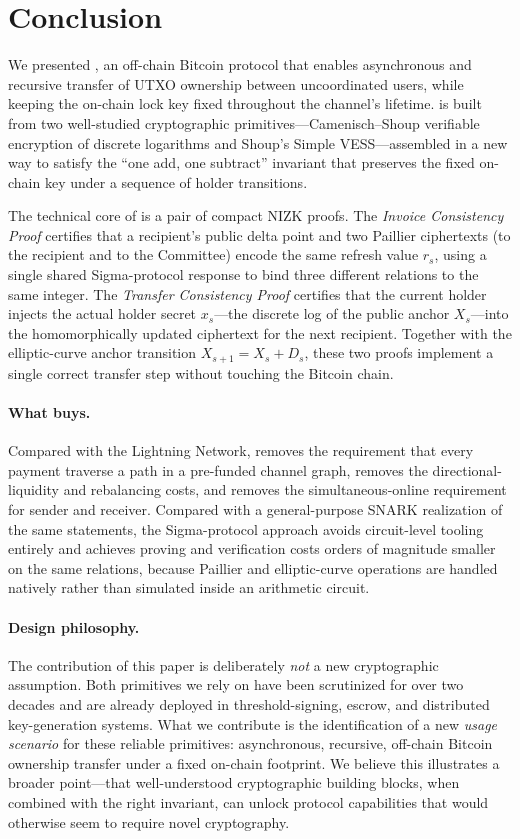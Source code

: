 \section{Conclusion}\label{sec:conclusion}

We presented \thunderbolt, an off-chain Bitcoin protocol that enables asynchronous and recursive transfer of UTXO ownership between uncoordinated users, while keeping the on-chain lock key fixed throughout the channel's lifetime. \thunderbolt is built from two well-studied cryptographic primitives---Camenisch--Shoup verifiable encryption of discrete logarithms and Shoup's Simple VESS---assembled in a new way to satisfy the ``one add, one subtract'' invariant that preserves the fixed on-chain key under a sequence of holder transitions.

The technical core of \thunderbolt is a pair of compact NIZK proofs. The \emph{Invoice Consistency Proof} certifies that a recipient's public delta point and two Paillier ciphertexts (to the recipient and to the Committee) encode the same refresh value $r_s$, using a single shared Sigma-protocol response to bind three different relations to the same integer. The \emph{Transfer Consistency Proof} certifies that the current holder injects the actual holder secret $x_s$---the discrete log of the public anchor $X_s$---into the homomorphically updated ciphertext for the next recipient. Together with the elliptic-curve anchor transition $X_{s+1} = X_s + D_s$, these two proofs implement a single correct transfer step without touching the Bitcoin chain.

\paragraph{What \thunderbolt buys.}
Compared with the Lightning Network, \thunderbolt removes the requirement that every payment traverse a path in a pre-funded channel graph, removes the directional-liquidity and rebalancing costs, and removes the simultaneous-online requirement for sender and receiver. Compared with a general-purpose SNARK realization of the same statements, the Sigma-protocol approach avoids circuit-level tooling entirely and achieves proving and verification costs orders of magnitude smaller on the same relations, because Paillier and elliptic-curve operations are handled natively rather than simulated inside an arithmetic circuit.

\paragraph{Design philosophy.}
The contribution of this paper is deliberately \emph{not} a new cryptographic assumption. Both primitives we rely on have been scrutinized for over two decades and are already deployed in threshold-signing, escrow, and distributed key-generation systems. What we contribute is the identification of a new \emph{usage scenario} for these reliable primitives: asynchronous, recursive, off-chain Bitcoin ownership transfer under a fixed on-chain footprint. We believe this illustrates a broader point---that well-understood cryptographic building blocks, when combined with the right invariant, can unlock protocol capabilities that would otherwise seem to require novel cryptography.

